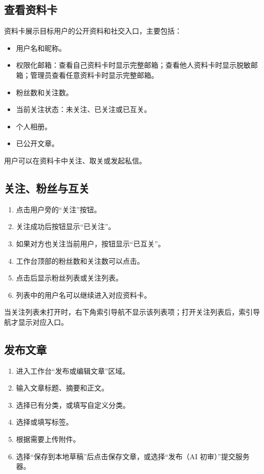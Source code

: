 \documentclass[UTF8,a4paper,12pt]{ctexart}
\begin{document}
\subsection{查看资料卡}

资料卡展示目标用户的公开资料和社交入口，主要包括：

\begin{itemize}
  \item 用户名和昵称。
  \item 权限化邮箱：查看自己资料卡时显示完整邮箱；查看他人资料卡时显示脱敏邮箱；管理员查看任意资料卡时显示完整邮箱。
  \item 粉丝数和关注数。
  \item 当前关注状态：未关注、已关注或已互关。
  \item 个人相册。
  \item 已公开文章。
\end{itemize}

用户可以在资料卡中关注、取关或发起私信。

\subsection{关注、粉丝与互关}

\begin{enumerate}
  \item 点击用户旁的“关注”按钮。
  \item 关注成功后按钮显示“已关注”。
  \item 如果对方也关注当前用户，按钮显示“已互关”。
  \item 工作台顶部的粉丝数和关注数可以点击。
  \item 点击后显示粉丝列表或关注列表。
  \item 列表中的用户名可以继续进入对应资料卡。
\end{enumerate}

当关注列表未打开时，右下角索引导航不显示该列表项；打开关注列表后，索引导航才显示对应入口。

\subsection{发布文章}

\begin{enumerate}
  \item 进入工作台“发布或编辑文章”区域。
  \item 输入文章标题、摘要和正文。
  \item 选择已有分类，或填写自定义分类。
  \item 选择或填写标签。
  \item 根据需要上传附件。
  \item 选择“保存到本地草稿”后点击保存文章，或选择“发布（AI 初审）”提交服务器。
\end{enumerate}
\end{document}
